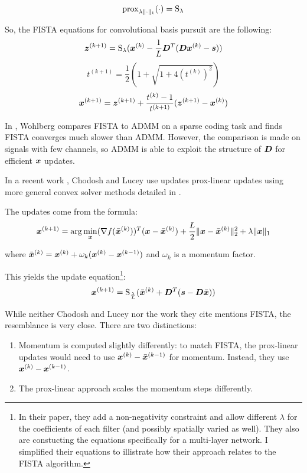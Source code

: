 \begin{equation}
\operatorname{prox}_{\lambda\|\cdot\|_1}(\cdot) = \operatorname{S}_{\lambda}
\end{equation}

So, the FISTA equations for convolutional basis pursuit are the following:
\begin{equation}
\bm{z}^{(k + 1)} = \operatorname{S}_{\lambda}(\bm{x}^{(k)} - \frac{1}{L}\bm{D}^T(\bm{D}\bm{x}^{(k)} - \bm{s}))
\end{equation}
\begin{equation}
t^{(k + 1)} = \frac{1}{2}(1 + \sqrt{1 + 4(t^{(k)})^2})
\end{equation}
\begin{equation}
\bm{x}^{(k + 1)} = \bm{z}^{(k + 1)} + \frac{t^{(k)} - 1}{t^{(k + 1)}}(\bm{z}^{(k + 1)} - \bm{x}^{(k)})
\end{equation}

In \cite{wohlberg2015efficient}, Wohlberg compares FISTA to ADMM on a sparse coding task and finds FISTA converges much slower than ADMM. However, the comparison is made on signals with few channels, so ADMM is able to exploit the structure of $\bm{D}$ for efficient $\bm{x}$ updates.

In a recent work \cite{chodosh2020use}, Chodosh and Lucey use updates prox-linear updates using more general convex solver methods detailed in \cite{xu2013block}.

The updates come from the formula:
\begin{equation}
\bm{x}^{(k + 1)} = \arg\min_{\bm{x}} (\nabla f(\bar{\bm{x}}^{(k)}))^T(\bm{x} - \bar{\bm{x}}^{(k)}) + \frac{L}{2}\|\bm{x} - \bar{\bm{x}}^{(k)}\|_2^2 + \lambda\|\bm{x}\|_1
\end{equation}

where $\bar{\bm{x}}^{(k)} = \bm{x}^{(k)} + \omega_k(\bm{x}^{(k)} - \bm{x}^{(k - 1)})$ and $\omega_k$ is a momentum factor.

This yields the update equation\footnote{In their paper, they add a non-negativity constraint and allow different $\lambda$ for the coefficients of each filter (and possibly spatially varied as well). They also are constucting the equations specifically for a multi-layer network. I simplified their equations to illistrate how their approach relates to the FISTA algorithm.}:
\begin{equation}
\bm{x}^{(k + 1)} = \operatorname{S}_{\frac{\lambda}{L}}(\bar{\bm{x}}^{(k)} + \bm{D}^T(\bm{s} - \bm{D}\bar{\bm{x}}))
\end{equation}

While neither Chodosh and Lucey nor the work they cite mentions FISTA, the resemblance is very close. There are two distinctions:
\begin{enumerate}
\item Momentum is computed slightly differently: to match FISTA, the prox-linear updates would need to use $\bm{x}^{(k)} - \bar{\bm{x}}^{(k - 1)}$ for momentum. Instead, they use $\bm{x}^{(k)} - \bm{x}^{(k - 1)}$.
\item The prox-linear approach scales the momentum steps differently.
\end{enumerate}

